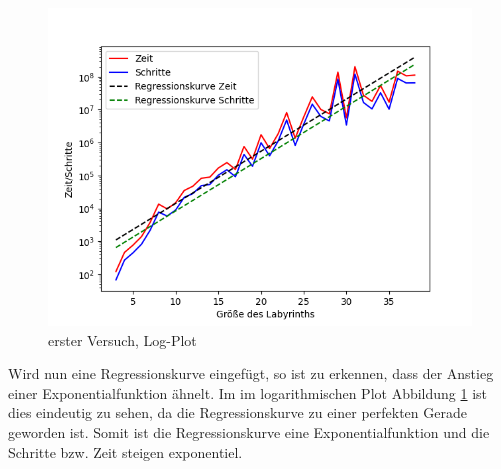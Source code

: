 \documentclass[12pt, a4paper, titlepage]{article}
\begin{document}
\begin{figure}[t]
	\centering
	\includegraphics[scale=.5]{v1AusLog.png}
	\caption{erster Versuch, Log-Plot}
	\label{fig:Plot v1Log}
\end{figure}

Wird nun eine Regressionskurve eingefügt, so ist zu erkennen, dass der Anstieg einer Exponentialfunktion ähnelt.
Im im logarithmischen Plot Abbildung \ref{fig:Plot v1Log} ist dies eindeutig zu sehen, da die Regressionskurve zu einer perfekten Gerade geworden ist.
Somit ist die Regressionskurve eine Exponentialfunktion und die Schritte bzw. Zeit steigen exponentiel.
\end{document}
